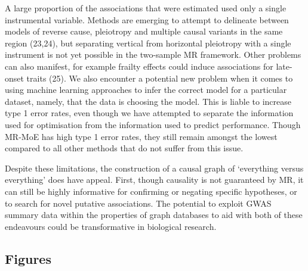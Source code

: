 \documentclass[]{article}
\begin{document}
A large proportion of the associations that were estimated used only a
single instrumental variable. Methods are emerging to attempt to
delineate between models of reverse cause, pleiotropy and multiple
causal variants in the same region (23,24), but separating vertical from
horizontal pleiotropy with a single instrument is not yet possible in
the two-sample MR framework. Other problems can also manifest, for
example frailty effects could induce associations for late-onset traits
(25). We also encounter a potential new problem when it comes to using
machine learning approaches to infer the correct model for a particular
dataset, namely, that the data is choosing the model. This is liable to
increase type 1 error rates, even though we have attempted to separate
the information used for optimisation from the information used to
predict performance. Though MR-MoE has high type 1 error rates, they
still remain amongst the lowest compared to all other methods that do
not suffer from this issue.

Despite these limitations, the construction of a causal graph of
`everything versus everything' does have appeal. First, though causality
is not guaranteed by MR, it can still be highly informative for
confirming or negating specific hypotheses, or to search for novel
putative associations. The potential to exploit GWAS summary data within
the properties of graph databases to aid with both of these endeavours
could be transformative in biological research.

\subsection{Figures}\label{figures}

\newpage
\end{document}
